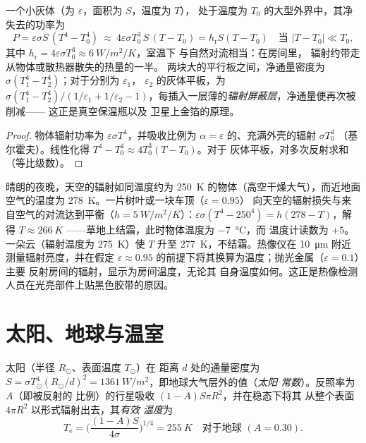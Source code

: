 \begin{proposition}[净交换与辐射换热系数]\label{prop:b2:thermal-radiation:exchange}
一个小灰体（为 $\varepsilon$，面积为 $S$，温度为 $T$），
处于温度为 $T_0$ 的大型外界中，其净失去的功率为
\[
P = \varepsilon\sigma S\,(T^4 - T_0^4)
\ \approx\ 4\varepsilon\sigma T_0^3\,S\,(T - T_0) = h_{\text{r}}S(T - T_0)
\quad\text{当 } |T - T_0| \ll T_0 ,
\]
其中 $h_{\text{r}} = 4\varepsilon\sigma T_0^3 \approx \qty{6}{W/m^2/K}$，室温下
与自然对流相当：在房间里，
辐射约带走从物体或散热器散失的热量的一半。
两块大的平行板之间，净通量密度为
$\sigma(T_1^4 - T_2^4)$；对于分别为 $\varepsilon_1$，
$\varepsilon_2$ 的灰体平板，为 $\sigma(T_1^4 - T_2^4)/(1/\varepsilon_1 + 1/\varepsilon_2
- 1)$，每插入一层薄的\emph{辐射屏蔽层}，净通量便再次被削减——
这正是真空保温瓶以及
卫星上金箔的原理。
\end{proposition}

\begin{proof}
物体辐射功率为 $\varepsilon\sigma T^4$，并吸收比例为 $\alpha =
\varepsilon$ 的、充满外壳的辐射 $\sigma T_0^4$
（基尔霍夫）。线性化得 $T^4 - T_0^4 \approx 4T_0^3(T - T_0)$。对于
灰体平板，对多次反射求和（等比级数）。
\end{proof}

\begin{example}[晴朗夜空下的霜与热像仪]\label{ex:b2:thermal-radiation:frost}
晴朗的夜晚，天空的辐射如同温度约为 \qty{250}{K}
的物体（高空干燥大气），而近地面空气的温度为
\qty{278}{K}。一片树叶或一块车顶（$\varepsilon = 0.95$）
向天空的辐射损失与来自空气的对流达到平衡（$h =
\qty{5}{W/m^2/K}$）：$\varepsilon\sigma(T^4 - 250^4) = h(278 - T)$，解得 $T
\approx \qty{266}{K}$ ——草地上结霜，此时物体温度为 \qty{-7}{\celsius}，而
温度计读数为 $+5$。一朵云（辐射温度为 \qty{275}{K}）使 $T$
升至 \qty{277}{K}，不结霜。热像仪在
\qty{10}{\micro m} 附近测量辐射亮度，并在假定
$\varepsilon \approx 0.95$ 的前提下将其换算为温度；抛光金属（$\varepsilon = 0.1$）主要
反射房间的辐射，显示为房间温度，无论其
自身温度如何。这正是热像检测人员在光亮部件上贴黑色胶带的原因。
\end{example}

\section{太阳、地球与温室}

\begin{proposition}[太阳常数与有效温度]\label{prop:b2:thermal-radiation:earth}
太阳（半径 $R_\odot$、表面温度 $T_\odot$）在
距离 $d$ 处的通量密度为 $S = \sigma T_\odot^4 (R_\odot/d)^2 =
\qty{1361}{W/m^2}$，即地球大气层外的值（\emph{太阳
常数}）。反照率为 $A$（即被反射的
比例）的行星吸收 $(1 - A)S\pi R^2$，并在稳态下将其
从整个表面 $4\pi R^2$ 以形式辐射出去，其\emph{有效
温度}为
\[
T_{\text{e}} = \Big(\frac{(1 - A)S}{4\sigma}\Big)^{1/4} = \qty{255}{K}
\quad\text{对于地球 } (A = 0.30) .
\]
\end{proposition}

